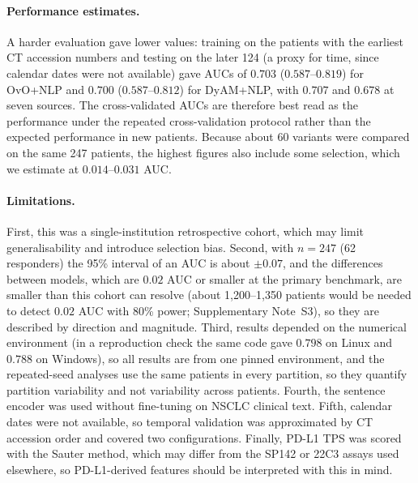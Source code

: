 \paragraph{Performance estimates.}
A harder evaluation gave lower values: training on the patients with the earliest CT accession numbers and testing on the later 124 (a proxy for time, since calendar
dates were not available) gave AUCs of $0.703$ ($0.587$--$0.819$) for OvO+NLP and $0.700$ ($0.587$--$0.812$) for DyAM+NLP, with $0.707$ and $0.678$ at seven sources.
The cross-validated AUCs are therefore best read as the performance under the repeated cross-validation protocol rather than the expected performance in new
patients. Because about 60 variants were compared on the same 247 patients, the highest figures also include some selection, which we estimate at $0.014$--$0.031$ AUC.

\paragraph{Limitations.}
First, this was a single-institution retrospective cohort, which may limit generalisability and introduce selection bias.
Second, with $n = 247$ (62 responders) the 95\% interval of an AUC is about $\pm 0.07$, and the differences between models, which are $0.02$ AUC or smaller
at the primary benchmark, are smaller than this cohort can resolve (about 1{,}200--1{,}350 patients would be needed to detect $0.02$ AUC with 80\% power;
Supplementary Note~S3), so they are described by direction and magnitude.
Third, results depended on the numerical environment (in a reproduction check the same code gave $0.798$ on Linux and $0.788$ on Windows), so all results
are from one pinned environment, and the repeated-seed analyses use the same patients in every partition, so they quantify partition variability and not variability across patients.
Fourth, the sentence encoder was used without fine-tuning on NSCLC clinical text.
Fifth, calendar dates were not available, so temporal validation was approximated by CT accession order and covered two configurations.
Finally, PD-L1 TPS was scored with the Sauter method, which may differ from the SP142 or 22C3 assays used elsewhere, so PD-L1-derived features should be
interpreted with this in mind.
